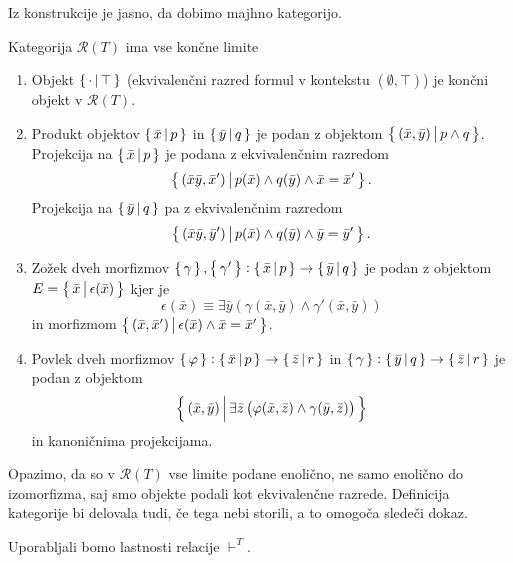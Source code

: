\documentclass[../kategoricna_logika.tex]{subfiles}
\begin{document}
\noindent
Iz konstrukcije je jasno, da dobimo majhno kategorijo.
\begin{lema}
  Kategorija $\mathcal{R}(T)$ ima vse končne limite
  \begin{enumerate}[label=(\roman*)]
    \item Objekt $\left\lbrace\,\cdot \,\middle|\, \top\,\right\rbrace$ (ekvivalenčni razred formul v kontekstu $(\emptyset, \top)$) je končni objekt v $\mathcal{R}(T)$.
    \item Produkt objektov $\left\lbrace\,\bar{x}\,\middle|\, p\,\right\rbrace$ in $\left\lbrace\,\bar{y}\,\middle|\, q\,\right\rbrace$ je podan z objektom
      $\left\lbrace\,(\bar{x},\bar{y})\,\middle|\, p \wedge q\,\right\rbrace$.
      Projekcija na $\left\lbrace\,\bar{x}\,\middle|\, p\,\right\rbrace$ je podana z ekvivalenčnim  razredom 
      $$\left\lbrace\,(\bar{x}\bar{y},\bar{x}')\,\middle|\, p(\bar{x}) \wedge q(\bar{y}) \wedge \bar{x} = \bar{x}'\,\right\rbrace.$$
      Projekcija na $\left\lbrace\,\bar{y}\,\middle|\, q\,\right\rbrace$ pa z ekvivalenčnim razredom
      $$\left\lbrace\,(\bar{x}\bar{y},\bar{y}')\,\middle|\, p(\bar{x}) \wedge q(\bar{y}) \wedge \bar{y} = \bar{y}'\,\right\rbrace.$$
    \item Zožek dveh morfizmov $\left\lbrace\,\gamma\,\right\rbrace, \left\lbrace\,\gamma'\,\right\rbrace : \left\lbrace\,\bar{x}\,\middle|\, p\,\right\rbrace \to \left\lbrace\,\bar{y}\,\middle|\, q\,\right\rbrace$
      je podan z objektom $E = \left\lbrace\,\bar{x}\,\middle|\, \epsilon(\bar{x})\,\right\rbrace$ kjer je 
      $$\epsilon(\bar{x}) \equiv \exists \bar{y}\left(\gamma(\bar{x},\bar{y}) \wedge \gamma'(\bar{x},\bar{y})\right)$$
      in morfizmom $\left\lbrace\,(\bar{x},\bar{x}')\,\middle|\, \epsilon(\bar{x}) \wedge \bar{x} = \bar{x}'\,\right\rbrace$.
    \item Povlek dveh morfizmov $\left\lbrace\,\varphi\,\right\rbrace : \left\lbrace\,\bar{x}\,\middle|\, p\,\right\rbrace \to  \left\lbrace\,\bar{z}\,\middle|\, r\,\right\rbrace$ in $\left\lbrace\,\gamma\,\right\rbrace : \left\lbrace\,\bar{y}\,\middle|\, q\,\right\rbrace \to \left\lbrace\,\bar{z}\,\middle|\, r\,\right\rbrace$
      je podan z objektom 
      $$\left\lbrace\,(\bar{x},\bar{y})\,\middle|\, \exists \bar{z} \left(\varphi(\bar{x},\bar{z}) \wedge \gamma(\bar{y},\bar{z})\right)\,\right\rbrace$$
      in kanoničnima projekcijama.
  \end{enumerate}
\end{lema}
\begin{opomba}
  Opazimo, da so v $\mathcal{R}(T)$ vse limite podane enolično, ne samo enolično do izomorfizma,
  saj smo objekte podali kot ekvivalenčne razrede. Definicija kategorije bi delovala tudi, če tega nebi storili, a to omogoča sledeči dokaz.
\end{opomba}
\begin{dokaz}
  Uporabljali bomo lastnosti relacije $\vdash^T$.
\end{dokaz}
\end{document}
